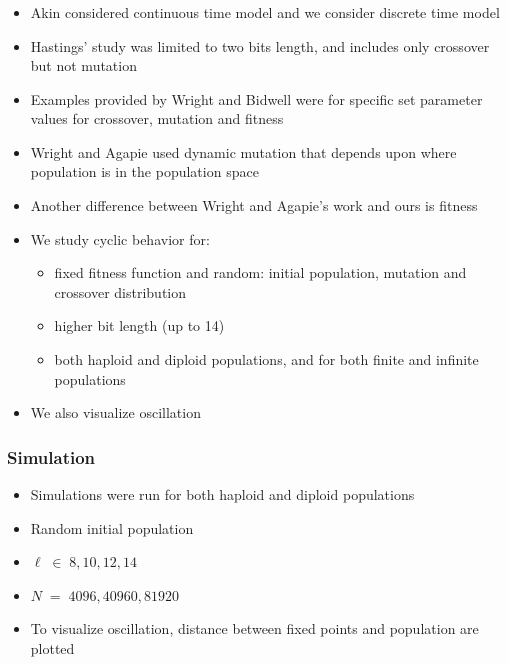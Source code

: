 \documentclass[aspectratio=169]{beamer}
\begin{document}
  \begin{frame}
    \frametitle{}
    \begin{itemize}
      \item{Akin considered continuous time model and we consider discrete time model}
      \item{Hastings' study was limited to two bits length, and includes only crossover but not mutation}
      \item{Examples provided by Wright and Bidwell were for specific set parameter values for crossover, mutation and fitness }
      \item{Wright and Agapie used dynamic mutation that depends upon where population is in the population space}
      \item{Another difference between Wright and Agapie's work and ours is fitness}
      \item{We study cyclic behavior for:}      
      \begin{itemize}
	\item{fixed fitness function and random: initial population, mutation and crossover distribution}
	\item{higher bit length (up to 14)}
	\item{both haploid and diploid populations, and for both finite and infinite populations}
      \end{itemize}
      \item{We also visualize oscillation}
    \end{itemize}
  \end{frame}
  
  \begin{frame}
    \frametitle{Simulation}
    \begin{itemize}
      \item{Simulations were run for both haploid and diploid populations}
      \item{Random initial population}     
      \item{$\ell \;\in\; {8, 10, 12, 14}$}
      \item{$N \;=\; {4096, 40960, 81920}$}
      \item{To visualize oscillation, distance between fixed points and population are plotted}
    \end{itemize}
  \end{frame}
  
\end{document}
